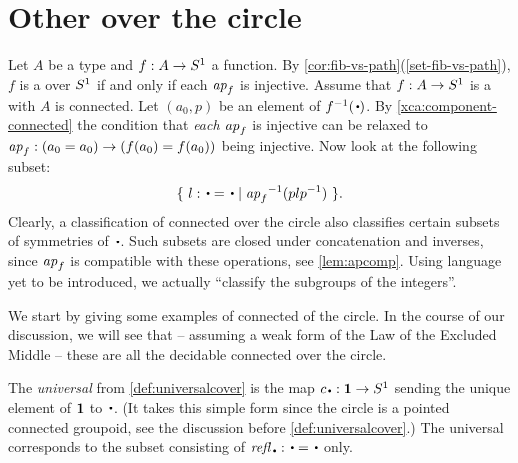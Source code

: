 
\section{Other \coverings over the circle}
\label{sec:covS1}

Let $A$ be a type and $f:A\to {S^1}$ a function.
By \cref{cor:fib-vs-path}(\ref{set-fib-vs-path}), $f$ is a \covering
over ${S^1}$ if and only if each $\mathop{{\it ap}_{f}}$ is injective.
Assume that $f:A\to {S^1}$ is a \covering with $A$ is connected.
Let $(a_0,p)$ be an element of $f^{-1}(\base)$. 
By \cref{xca:component-connected}
the condition that \emph{each} $\mathop{{\it ap}_{f}}$ is injective
can be relaxed to $\mathop{{\it ap}_{f}}: (a_0=a_0)\to(f(a_0)=f(a_0))$ being injective.
Now look at the following subset:
\[
\set{~ l: \base = \base \mid {\ap{f}}^{-1}(plp^{-1})~ }.
\]
Clearly, a classification of connected \coverings over the circle
also classifies certain subsets of symmetries of $\base$.
Such subsets are closed under concatenation and inverses,
since $\mathop{{\it ap}_{f}}$ is compatible with these operations,
see \cref{lem:apcomp}.
Using language yet to be introduced, we actually ``classify the subgroups of the integers''.

We start by giving some examples of connected \coverings of the circle.
In the course of our discussion, we will see that -- assuming a weak form
of the Law of the Excluded Middle -- these are all the decidable connected 
\coverings over the circle.

\begin{example}\label{exa:univS1cover}
The \emph{universal} \covering from \cref{def:universalcover}
is the map $c_\base:\bn 1\to \Sc$ 
sending the unique element of $\mathbf{1}$ to $\base$. 
(It takes this simple form since the circle is a pointed connected
groupoid, see the discussion before \cref{def:universalcover}.)
The universal \covering corresponds to the subset consisting 
of $\refl\base : \base=\base$ only.  
\end{example}

